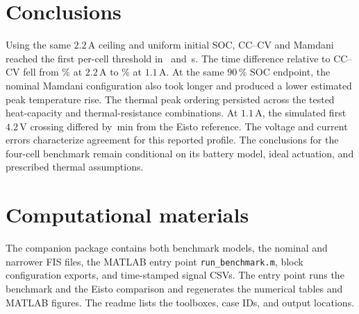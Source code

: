 \documentclass[a4paper,10pt,twocolumn]{article}
\begin{document}
\section{Conclusions}
Using the same $2.2\,\mathrm{A}$ ceiling and uniform initial SOC, CC--CV and Mamdani reached the first per-cell threshold in \TimeCC\ and \TimeFZ\,s. The time difference relative to CC--CV fell from \RelativeExtraFZ\% at $2.2\,\mathrm{A}$ to \LateLowCap\% at $1.1\,\mathrm{A}$. At the same $90\,\%$ SOC endpoint, the nominal Mamdani configuration also took longer and produced a lower estimated peak temperature rise. The thermal peak ordering persisted across the tested heat-capacity and thermal-resistance combinations. At $1.1\,\mathrm{A}$, the simulated first $4.2\,\mathrm{V}$ crossing differed by \EistoAbsGapV\,min from the Eisto reference. The voltage and current errors characterize agreement for this reported profile. The conclusions for the four-cell benchmark remain conditional on its battery model, ideal actuation, and prescribed thermal assumptions.

\section*{Computational materials}
The companion package contains both benchmark models, the nominal and narrower FIS files, the MATLAB entry point \texttt{run\_benchmark.m}, block configuration exports, and time-stamped signal CSVs. The entry point runs the benchmark and the Eisto comparison and regenerates the numerical tables and MATLAB figures. The readme lists the toolboxes, case IDs, and output locations.
\end{document}

